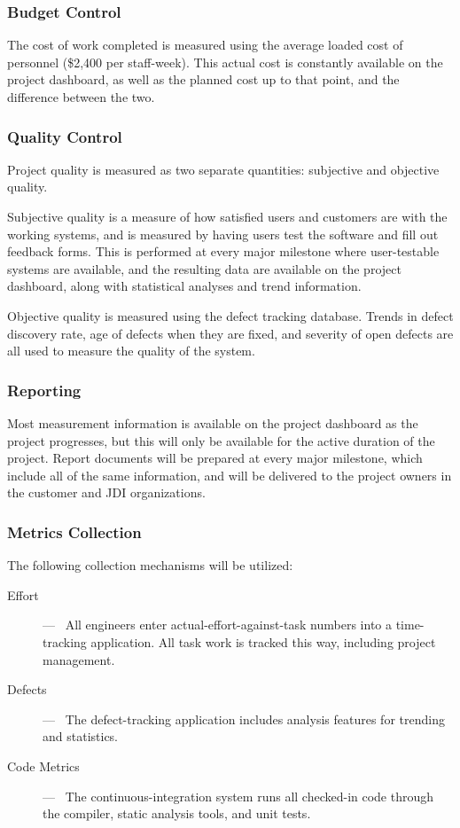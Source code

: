 \documentclass[11pt]{article}
\newcommand{\loadedcost}{\$2,400 per staff-week}
\begin{document}
\subsubsection{Budget Control}
The cost of work completed is measured using the average loaded cost of personnel (\loadedcost).
This actual cost is constantly available on the project dashboard, as well as the planned cost up to
that point, and the difference between the two.  

\subsubsection{Quality Control}
Project quality is measured as two separate quantities: subjective and objective quality.

Subjective quality is a measure of how satisfied users and customers are with the working systems,
and is measured by having users test the software and fill out feedback forms.  This is performed at
every major milestone where user-testable systems are available, and the resulting data are
available on the project dashboard, along with statistical analyses and trend information.

Objective quality is measured using the defect tracking database.  Trends in defect discovery rate,
age of defects when they are fixed, and severity of open defects are all used to measure the quality
of the system.
  
\subsubsection{Reporting}
Most measurement information is available on the project dashboard as the project progresses, but
this will only be available for the active duration of the project.  Report documents will be
prepared at every major milestone, which include all of the same information, and will be delivered
to the project owners in the customer and JDI organizations.

\subsubsection{Metrics Collection}
The following collection mechanisms will be utilized:
\begin{description}
\item[Effort] ---~ All engineers enter actual-effort-against-task numbers into a time-tracking
  application.  All task work is tracked this way, including project management.
\item[Defects] ---~ The defect-tracking application includes analysis features for trending and
  statistics.
\item[Code Metrics] ---~ The continuous-integration system runs all checked-in code through the
  compiler, static analysis tools, and unit tests.
\end{description}
\end{document}
